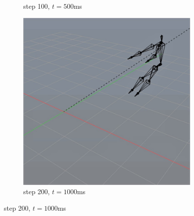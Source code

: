 \documentclass[10pt,twocolumn,letterpaper]{article}
\begin{document}
\begin{figure}
\begin{subfigure}{0.2\textwidth}
        \caption{step 100, $t=500$ms}
    \end{subfigure}\begin{subfigure}{0.2\textwidth}
        \centering
        \includegraphics[width=.9\linewidth]{linear-cannon-1000.jpg}
        \caption{step 200, $t=1000$ms}
    \end{subfigure}


\end{figure}
\end{document}
